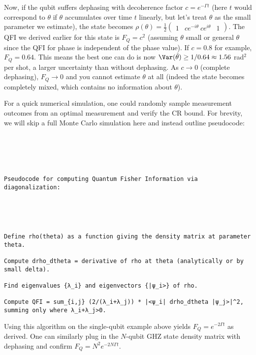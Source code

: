 Now, if the qubit suffers dephasing with decoherence factor $c =
e^{-\Gamma t}$ (here $t$ would correspond to $\theta$ if $\theta$
accumulates over time $t$ linearly, but let’s treat $\theta$ as the
small parameter we estimate), the state becomes $\rho(\theta) =
\frac{1}{2}\begin{pmatrix}1 & c e^{-i\theta} \ c e^{i\theta} &
  1\end{pmatrix}$. The QFI we derived earlier for this state is $F_Q =
  c^2$ (assuming $\theta$ small or general $\theta$ since the QFI for
  phase is independent of the phase value). If $c=0.8$ for example,
  $F_Q = 0.64$. This means the best one can do is now
  $\Var(\hat{\theta}) \ge 1/0.64 \approx 1.56$ rad$^2$ per shot, a
  larger uncertainty than without dephasing. As $c \to 0$ (complete
  dephasing), $F_Q \to 0$ and you cannot estimate $\theta$ at all
  (indeed the state becomes completely mixed, which contains no
  information about $\theta$).



For a quick numerical simulation, one could randomly sample
measurement outcomes from an optimal measurement and verify the CR
bound. For brevity, we will skip a full Monte Carlo simulation here
and instead outline pseudocode:



\begin{verbatim}





Pseudocode for computing Quantum Fisher Information via diagonalization:





Define rho(theta) as a function giving the density matrix at parameter theta.

Compute drho_dtheta = derivative of rho at theta (analytically or by small delta).

Find eigenvalues {λ_i} and eigenvectors {|ψ_i>} of rho.

Compute QFI = sum_{i,j} (2/(λ_i+λ_j)) * |<ψ_i| drho_dtheta |ψ_j>|^2, summing only where λ_i+λ_j>0.

\end{verbatim}



Using this algorithm on the single-qubit example above yields $F_Q =
e^{-2\Gamma t}$ as derived. One can similarly plug in the $N$-qubit
GHZ state density matrix with dephasing and confirm $F_Q = N^2
e^{-2N\Gamma t}$.



